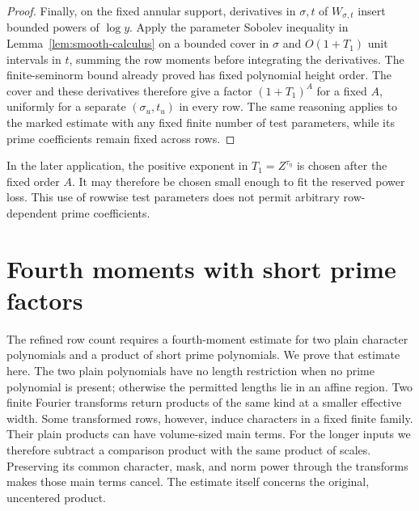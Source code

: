 \documentclass[11pt,a4paper]{article}
\numberwithin{equation}{section}
\numberwithin{figure}{section}
\theoremstyle{definition}
\theoremstyle{remark}
\begin{document}
\begin{proof}
Finally, on the fixed annular support, derivatives in \(\sigma,t\)
of \(W_{\sigma,t}\) insert bounded powers of \(\log y\).  Apply
the parameter Sobolev inequality in
Lemma~\ref{lem:smooth-calculus} on a bounded cover in \(\sigma\)
and \(O(1+T_1)\) unit intervals in \(t\), summing the row moments
before integrating the derivatives.  The finite-seminorm bound
already proved has fixed polynomial height order.  The cover and
these derivatives therefore give a factor \((1+T_1)^A\) for a
fixed \(A\), uniformly for a separate \((\sigma_u,t_u)\) in every
row.  The same reasoning applies to the marked estimate with any
fixed finite number of test parameters, while its prime coefficients
remain fixed across rows.
\end{proof}

In the later application, the positive exponent in
\(T_1=Z^{\tau_\eta}\) is chosen after the fixed order \(A\).
It may therefore be chosen small enough to fit the reserved power
loss.  This use of rowwise test parameters does not permit arbitrary
row-dependent prime coefficients.

\section{Fourth moments with short prime factors}\label{sec:plain}

The refined row count requires a fourth-moment estimate for two plain
character polynomials and a product of short prime polynomials.  We prove
that estimate here.  The two plain polynomials have no length restriction
when no prime polynomial is present; otherwise the permitted lengths lie
in an affine region.  Two finite Fourier transforms return products of the
same kind at a smaller effective width.  Some transformed rows, however,
induce characters in a fixed
finite family.  Their plain products can have volume-sized main terms.
For the longer inputs we therefore subtract a comparison product with the
same product of scales.  Preserving its common character, mask, and norm
power through the transforms makes those main terms cancel.  The estimate
itself concerns the original, uncentered product.
\end{document}
